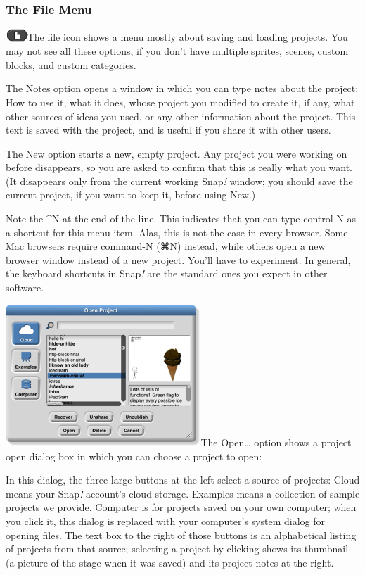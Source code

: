 \subsubsection{The File Menu}\label{the-file-menu}

\includegraphics[width=0.31944in,height=0.18056in]{media/image384.png}The
file icon shows a menu mostly about saving and loading projects. You may
not see all these options, if you don't have multiple sprites, scenes,
custom blocks, and custom categories.

The Notes option opens a window in which you can type notes about the
project: How to use it, what it does, whose project you modified to
create it, if any, what other sources of ideas you used, or any other
information about the project. This text is saved with the project, and
is useful if you share it with other users.

The New option starts a new, empty project. Any project you were working
on before disappears, so you are asked to confirm that this is really
what you want. (It disappears only from the current working Snap\emph{!}
window; you should save the current project, if you want to keep it,
before using New.)

Note the \^{}N at the end of the line. This indicates that you can type
control-N as a shortcut for this menu item. Alas, this is not the case
in every browser. Some Mac browsers require command-N (⌘N) instead,
while others open a new browser window instead of a new project. You'll
have to experiment. In general, the keyboard shortcuts in Snap\emph{!}
are the standard ones you expect in other software.

\includegraphics[width=2.88958in,height=2.09792in]{media/image995.png}The
Open\ldots{} option shows a project open dialog box in which you can
choose a project to open:

In this dialog, the three large buttons at the left select a source of
projects: Cloud means your Snap\emph{!} account's cloud storage.
Examples means a collection of sample projects we provide. Computer is
for projects saved on your own computer; when you click it, this dialog
is replaced with your computer's system dialog for opening files. The
text box to the right of those buttons is an alphabetical listing of
projects from that source; selecting a project by clicking shows its
thumbnail (a picture of the stage when it was saved) and its project
notes at the right.

